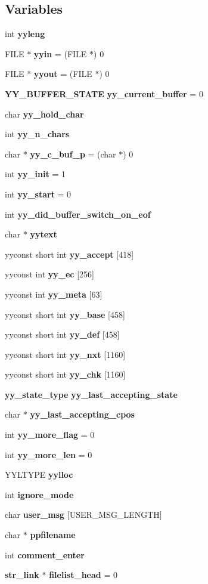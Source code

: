 \subsection*{Variables}
\begin{CompactItemize}
\item 
int {\bf yyleng}
\item 
FILE $\ast$ {\bf yyin} = (FILE $\ast$) 0
\item 
FILE $\ast$ {\bf yyout} = (FILE $\ast$) 0
\item 
{\bf YY\_\-BUFFER\_\-STATE} {\bf yy\_\-current\_\-buffer} = 0
\item 
char {\bf yy\_\-hold\_\-char}
\item 
int {\bf yy\_\-n\_\-chars}
\item 
char $\ast$ {\bf yy\_\-c\_\-buf\_\-p} = (char $\ast$) 0
\item 
int {\bf yy\_\-init} = 1
\item 
int {\bf yy\_\-start} = 0
\item 
int {\bf yy\_\-did\_\-buffer\_\-switch\_\-on\_\-eof}
\item 
char $\ast$ {\bf yytext}
\item 
yyconst short int {\bf yy\_\-accept} [418]
\item 
yyconst int {\bf yy\_\-ec} [256]
\item 
yyconst int {\bf yy\_\-meta} [63]
\item 
yyconst short int {\bf yy\_\-base} [458]
\item 
yyconst short int {\bf yy\_\-def} [458]
\item 
yyconst short int {\bf yy\_\-nxt} [1160]
\item 
yyconst short int {\bf yy\_\-chk} [1160]
\item 
{\bf yy\_\-state\_\-type} {\bf yy\_\-last\_\-accepting\_\-state}
\item 
char $\ast$ {\bf yy\_\-last\_\-accepting\_\-cpos}
\item 
int {\bf yy\_\-more\_\-flag} = 0
\item 
int {\bf yy\_\-more\_\-len} = 0
\item 
YYLTYPE {\bf yylloc}
\item 
int {\bf ignore\_\-mode}
\item 
char {\bf user\_\-msg} [USER\_\-MSG\_\-LENGTH]
\item 
char $\ast$ {\bf ppfilename}
\item 
int {\bf comment\_\-enter}
\item 
{\bf str\_\-link} $\ast$ {\bf filelist\_\-head} = 0

\end{CompactItemize}
